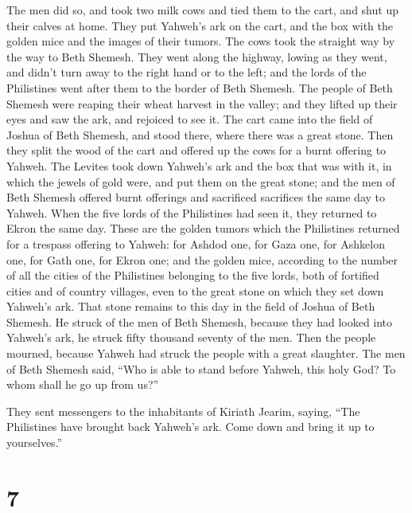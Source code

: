  The men did so, and took two milk cows and tied them to
the cart, and shut up their calves at home.  They put
Yahweh's ark on the cart, and the box with the golden mice and the
images of their tumors.  The cows took the straight way
by the way to Beth Shemesh. They went along the highway, lowing as they
went, and didn't turn away to the right hand or to the left; and the
lords of the Philistines went after them to the border of Beth Shemesh.
 The people of Beth Shemesh were reaping their wheat
harvest in the valley; and they lifted up their eyes and saw the ark,
and rejoiced to see it.  The cart came into the field of
Joshua of Beth Shemesh, and stood there, where there was a great stone.
Then they split the wood of the cart and offered up the cows for a burnt
offering to Yahweh.  The Levites took down Yahweh's ark
and the box that was with it, in which the jewels of gold were, and put
them on the great stone; and the men of Beth Shemesh offered burnt
offerings and sacrificed sacrifices the same day to Yahweh.
 When the five lords of the Philistines had seen it, they
returned to Ekron the same day.  These are the golden
tumors which the Philistines returned for a trespass offering to Yahweh:
for Ashdod one, for Gaza one, for Ashkelon one, for Gath one, for Ekron
one;  and the golden mice, according to the number of all
the cities of the Philistines belonging to the five lords, both of
fortified cities and of country villages, even to the great stone on
which they set down Yahweh's ark. That stone remains to this day in the
field of Joshua of Beth Shemesh.  He struck of the men of
Beth Shemesh, because they had looked into Yahweh's ark, he struck fifty
thousand seventy of the men. Then the people mourned, because Yahweh had
struck the people with a great slaughter.  The men of
Beth Shemesh said, ``Who is able to stand before Yahweh, this holy God?
To whom shall he go up from us?''

 They sent messengers to the inhabitants of Kiriath
Jearim, saying, ``The Philistines have brought back Yahweh's ark. Come
down and bring it up to yourselves.''

\hypertarget{section-6}{%
\section{7}\label{section-6}}

